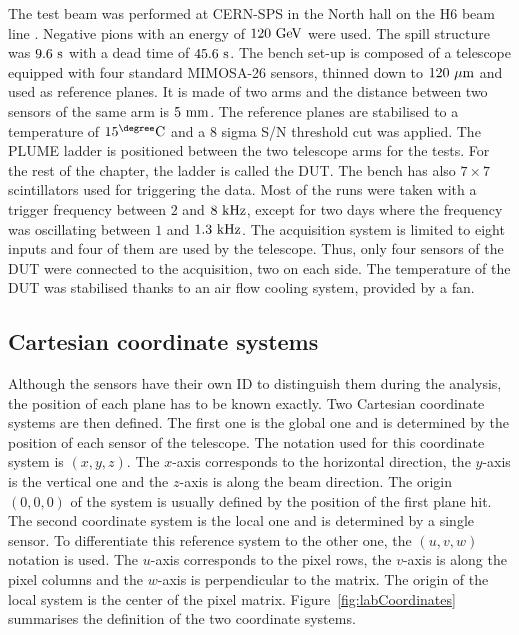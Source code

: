     The test beam was performed at CERN-SPS in the North hall on the H6 beam line \cite{SPS}.
    Negative pions with an energy of $120~\rm{GeV}$ were used.
    The spill structure was $9.6~\rm{s}$ with a dead time of $45.6~\rm{s}$. 
    The bench set-up is composed of a telescope equipped with four standard MIMOSA-26 sensors, thinned down to $120~\rm{\mu m}$ and used as reference planes.
    It is made of two arms and the distance between two sensors of the same arm is $5~\rm{mm}$.
    The reference planes are stabilised to a temperature of $15^{\degree}\rm{C}$ and a 8 sigma S/N threshold cut was applied.
    The \gls{PLUME} ladder is positioned between the two telescope arms for the tests.
    For the rest of the chapter, the ladder is called the \gls{DUT}.
    The bench has also $7 \times 7$ scintillators used for triggering the data.
    Most of the runs were taken with a trigger frequency between $2$ and $8~\rm{kHz}$, except for two days where the frequency was oscillating between $1$ and $1.3~\rm{kHz}$.
    The acquisition system is limited to eight inputs and four of them are used by the telescope.
    Thus, only four sensors of the \gls{DUT} were connected to the acquisition, two on each side.
    The temperature of the \gls{DUT} was stabilised thanks to an air flow cooling system, provided by a fan.

    \subsection{Cartesian coordinate systems}

    Although the sensors have their own ID to distinguish them during the analysis, the position of each plane has to be known exactly.
    Two Cartesian coordinate systems are then defined.
    The first one is the global one and is determined by the position of each sensor of the telescope.
    The notation used for this coordinate system is $(x,y,z)$.
    The $x$-axis corresponds to the horizontal direction, the $y$-axis is the vertical one and the $z$-axis is along the beam direction.
    The origin $(0,0,0)$ of the system is usually defined by the position of the first plane hit.
    The second coordinate system is the local one and is determined by a single sensor.
    To differentiate this reference system to the other one, the $(u,v,w)$ notation is used.
    The $u$-axis corresponds to the pixel rows, the $v$-axis is along the pixel columns and the $w$-axis is perpendicular to the matrix.
    The origin of the local system is the center of the pixel matrix.
    Figure~\ref{fig:labCoordinates} summarises the definition of the two coordinate systems.

